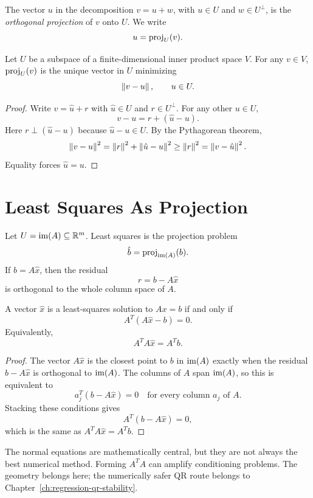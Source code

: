\begin{definition}
The vector $u$ in the decomposition $v=u+w$, with $u\in U$ and
$w\in U^\perp$, is the \emph{orthogonal projection} of $v$ onto $U$. We write
\[
  u=\operatorname{proj}_U(v).
\]
\end{definition}

\begin{proposition}
Let $U$ be a subspace of a finite-dimensional inner product space $V$. For any
$v\in V$, $\operatorname{proj}_U(v)$ is the unique vector in $U$ minimizing
\[
  \left\lVert v-u \right\rVert,\qquad u\in U.
\]
\end{proposition}

\begin{proof}
Write $v=\hat{u}+r$ with $\hat{u}\in U$ and $r\in U^\perp$. For any other
$u\in U$,
\[
  v-u = r + (\hat{u}-u).
\]
Here $r\perp(\hat{u}-u)$ because $\hat{u}-u\in U$. By the Pythagorean theorem,
\[
  \left\lVert v-u \right\rVert^2
  =
  \left\lVert r \right\rVert^2+\left\lVert \hat{u}-u \right\rVert^2
  \geq
  \left\lVert r \right\rVert^2
  =
  \left\lVert v-\hat{u} \right\rVert^2.
\]
Equality forces $\hat{u}=u$.
\end{proof}

\section{Least Squares As Projection}

Let $U=\operatorname{im}(A)\subseteq\mathbb{R}^m$. Least squares is the projection problem
\[
  \hat{b}=\operatorname{proj}_{\operatorname{im}(A)}(b).
\]
If $\hat{b}=A\hat{x}$, then the residual
\[
  r=b-A\hat{x}
\]
is orthogonal to the whole column space of $A$.

\begin{theorem}
A vector $\hat{x}$ is a least-squares solution to $Ax=b$ if and only if
\[
  A^T(A\hat{x}-b)=0.
\]
Equivalently,
\[
  A^TA\hat{x}=A^Tb.
\]
\end{theorem}

\begin{proof}
The vector $A\hat{x}$ is the closest point to $b$ in $\operatorname{im}(A)$ exactly when
the residual $b-A\hat{x}$ is orthogonal to $\operatorname{im}(A)$. The columns of $A$ span
$\operatorname{im}(A)$, so this is equivalent to
\[
  a_j^T(b-A\hat{x})=0
  \quad\text{for every column }a_j\text{ of }A.
\]
Stacking these conditions gives
\[
  A^T(b-A\hat{x})=0,
\]
which is the same as $A^TA\hat{x}=A^Tb$.
\end{proof}

\begin{warningbox}
The normal equations are mathematically central, but they are not always the
best numerical method. Forming $A^TA$ can amplify conditioning problems. The
geometry belongs here; the numerically safer QR route belongs to
Chapter~\ref{ch:regression-qr-stability}.
\end{warningbox}

